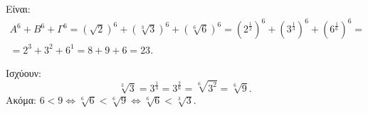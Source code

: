 
\begin{alist}
\item Είναι:
\begin{gather*}
A^6 + B^6 + \Gamma^6 = \left(\sqrt{2}\right)^6 + \left(\sqrt[3]{3}\right)^6 + \left(\sqrt[6]{6}\right)^6 = \left(2^{\frac{1}{2}}\right)^6 + \left(3^{\frac{1}{3}}\right)^6 + \left(6^{\frac{1}{6}}\right)^6= \\
= 2^3 + 3^2 + 6^1 = 8 + 9 + 6 = 23.
\end{gather*}

\item Ισχύουν:
\[\sqrt[3]{3} = 3^{\frac{1}{3}} = 3^{\frac{2}{6}} = \sqrt[6]{3^2} = \sqrt[6]{9}.\]
Ακόμα: $6 < 9 \Leftrightarrow \sqrt[6]{6} < \sqrt[6]{9} \Leftrightarrow \sqrt[6]{6} < \sqrt[3]{3}$.
\end{alist}

